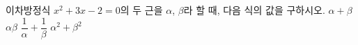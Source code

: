이차방정식 $x^2+3x-2=0$의 두 근을 $\alpha$, $\beta$라 할 때, 다음 식의 값을 구하시오.
 $\alpha+\beta$
 $\alpha\beta$
 $\dfrac{1}{\alpha}+\dfrac{1}{\beta}$
 $\alpha^2+\beta^2$
